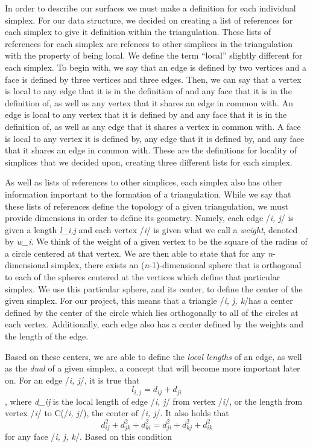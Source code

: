 \documentclass[12pt]{article}
\begin{document}
\noindent In order to describe our surfaces we must make a definition for each individual simplex. For our data structure, we decided on creating a list of references for each simplex to give it definition within the triangulation. These lists of references for each simplex are refences to other simplices in the triangulation with the property of being local. We define the term ``local'' slightly different for each simplex. To begin with, we say that an edge is defined by two vertices and a face is defined by three vertices and three edges. Then, we can say that a vertex is local to any edge that it is in the definition of and any face that it is in the definition of, as well as any vertex that it shares an edge in common with. An edge is local to any vertex that it is defined by and any face that it is in the definition of, as well as any edge that it shares a vertex in common with. A face is local to any vertex it is defined by, any edge that it is defined by, and any face that it shares an edge in common with. These are the definitions for locality of simplices that we decided upon, creating three different lists for each simplex. 

\noindent As well as lists of references to other simplices, each simplex also has other information important to the formation of a triangulation. While we say that these lists of references define the topology of a given triangulation, we must provide dimensions in order to define its geometry. Namely, each edge /{\textit{i, j}/} is given a length \textit{l_{i,j}} and each vertex /{\textit{i}/} is given what we call a \textit{weight}, denoted by \textit{w_i}. We think of the weight of a given vertex to be the square of the radius of a circle centered at that vertex. We are then able to state that for any \textit{n}-dimensional simplex, there exists an (\textit{n}-1)-dimensional sphere that is orthogonal to each of the spheres centered at the vertices which define that particular simplex. We use this particular sphere, and its center, to define the center of the given simplex. For our project, this means that a triangle /{\textit{i, j, k}/}has a center defined by the center of the circle which lies orthogonally to all of the circles at each vertex. Additionally, each edge also has a center defined by the weights and the length of the edge. \newline

\noindent Based on these centers, we are able to define the \textit{local lengths} of an edge, as well as the \textit{dual} of a given simplex, a concept that will become more important later on. For an edge /{\textit{i, j}/}, it is true that $$l_{i,j} = d_{ij} + d_{ji}$$, where \textit{d_{ij}} is the local length of edge /{\textit{i, j}/} from vertex /{\textit{i}/}, or the length from vertex /{\textit{i}/} to C(/{\textit{i, j}/}), the center of /{\textit{i, j}/}. It also holds that $$d_{ij}^2 + d_{jk}^2 + d_{ki}^2 = d_{ji}^2 + d_{kj}^2 + d_{ik}^2$$ for any face /{\textit{i, j, k}/}. Based on this condition
\end{document}

